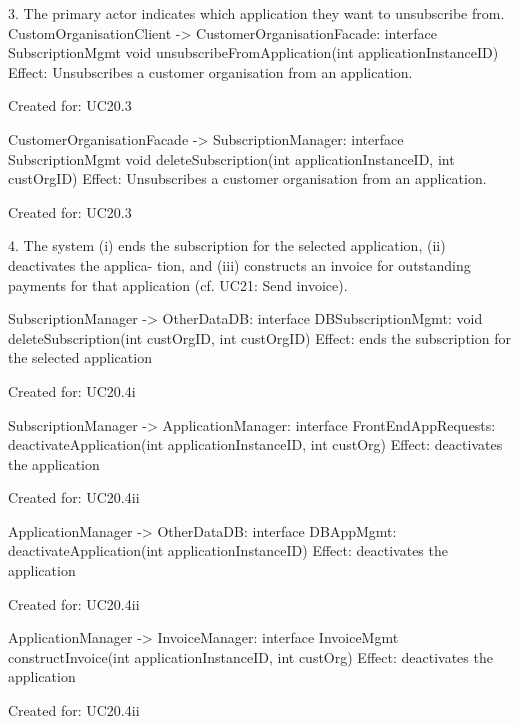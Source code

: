 {{{{{{{{        3. The primary actor indicates which application they want to unsubscribe from.
             CustomOrganisationClient -> CustomerOrganisationFacade: interface SubscriptionMgmt
                                              void  unsubscribeFromApplication(int applicationInstanceID)
             Effect: Unsubscribes a customer organisation from an application.
             \item Created for: UC20.3
             
             CustomerOrganisationFacade -> SubscriptionManager: interface SubscriptionMgmt
                                              void  deleteSubscription(int applicationInstanceID, int custOrgID)
             Effect: Unsubscribes a customer organisation from an application.
             \item Created for: UC20.3
                                                         
        4. The system (i) ends the subscription for the selected application, (ii) deactivates the applica-
            tion, and (iii) constructs an invoice for outstanding payments for that application (cf. UC21:
            Send invoice).
            
            SubscriptionManager -> OtherDataDB: interface DBSubscriptionMgmt:
                                             void deleteSubscription(int custOrgID, int custOrgID)
                Effect: ends the subscription for the selected application
                \item Created for: UC20.4i
            
            SubscriptionManager -> ApplicationManager: interface FrontEndAppRequests:
                                    deactivateApplication(int applicationInstanceID, int custOrg)
                Effect: deactivates the application
                \item Created for: UC20.4ii
            
            ApplicationManager -> OtherDataDB: interface DBAppMgmt:
                                    deactivateApplication(int applicationInstanceID)
                Effect: deactivates the application
                \item Created for: UC20.4ii
            
            
            ApplicationManager  -> InvoiceManager: interface InvoiceMgmt
                                   constructInvoice(int applicationInstanceID, int custOrg)
                Effect: deactivates the application
                \item Created for: UC20.4ii
            
}}}}}}}}
